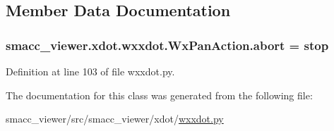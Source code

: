 \subsection{Member Data Documentation}
\subsubsection[{\texorpdfstring{abort}{abort}}]{\setlength{\rightskip}{0pt plus 5cm}smacc\+\_\+viewer.\+xdot.\+wxxdot.\+Wx\+Pan\+Action.\+abort = {\bf stop}\hspace{0.3cm}{\ttfamily [static]}}\hypertarget{classsmacc__viewer_1_1xdot_1_1wxxdot_1_1WxPanAction_ac3820a78436788f2c04cf86f4e41cd53}{}\label{classsmacc__viewer_1_1xdot_1_1wxxdot_1_1WxPanAction_ac3820a78436788f2c04cf86f4e41cd53}


Definition at line 103 of file wxxdot.\+py.



The documentation for this class was generated from the following file\+:\begin{DoxyCompactItemize}
\item 
smacc\+\_\+viewer/src/smacc\+\_\+viewer/xdot/\hyperlink{wxxdot_8py}{wxxdot.\+py}\end{DoxyCompactItemize}
